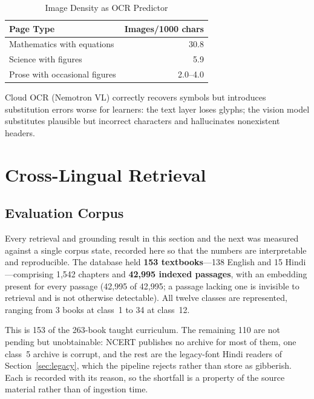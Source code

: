 \documentclass[conference]{IEEEtran}
\begin{document}
\begin{table}[htbp]
\caption{Image Density as OCR Predictor}
\label{tab:ocr}
\centering
\begin{tabular}{@{}lr@{}}
\toprule
\textbf{Page Type} & \textbf{Images/1000 chars} \\
\midrule
Mathematics with equations & 30.8 \\
Science with figures & 5.9 \\
Prose with occasional figures & 2.0--4.0 \\
\bottomrule
\end{tabular}
\end{table}

Cloud OCR (Nemotron VL) correctly recovers symbols but introduces substitution errors worse for learners: the text layer loses glyphs; the vision model substitutes plausible but incorrect characters and hallucinates nonexistent headers.

\section{Cross-Lingual Retrieval}
\label{sec:cross_lingual}

\subsection{Evaluation Corpus}
\label{sec:evalcorpus}
Every retrieval and grounding result in this section and the next was measured against a single corpus state, recorded here so that the numbers are interpretable and reproducible. The database held \textbf{153 textbooks}---138 English and 15 Hindi---comprising 1{,}542 chapters and \textbf{42{,}995 indexed passages}, with an embedding present for every passage (42{,}995 of 42{,}995; a passage lacking one is invisible to retrieval and is not otherwise detectable). All twelve classes are represented, ranging from 3 books at class~1 to 34 at class~12.

This is 153 of the 263-book taught curriculum. The remaining 110 are not pending but unobtainable: NCERT publishes no archive for most of them, one class~5 archive is corrupt, and the rest are the legacy-font Hindi readers of Section~\ref{sec:legacy}, which the pipeline rejects rather than store as gibberish. Each is recorded with its reason, so the shortfall is a property of the source material rather than of ingestion time.
\end{document}
